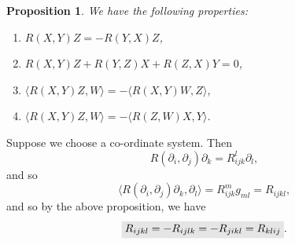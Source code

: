 \documentclass[letter-paper]{tufte-book}
\newtheorem{proposition}[theorem]{\color{pastel-blue}Proposition}
\newcommand{\highlight}[1]{\mathchoice%
  {\colorbox{black!10}{$\displaystyle#1$}}%
  {\colorbox{black!10}{$\textstyle#1$}}%
  {\colorbox{black!10}{$\scriptstyle#1$}}%
  {\colorbox{black!10}{$\scriptscriptstyle#1$}}}%
\begin{document}
\begin{proposition}
  We have the following properties:
  \begin{enumerate}
    \item $R(X,Y) Z = -R(Y,X) Z$,
    \item $R(X,Y) Z + R(Y,Z) X + R(Z,X) Y = 0$,
    \item $\langle R(X,Y)Z, W\rangle = -\langle R(X,Y)W, Z\rangle$,
    \item $\langle R(X,Y)Z, W\rangle = -\langle R(Z,W)X, Y\rangle$.
  \end{enumerate}
\end{proposition}

Suppose we choose a co-ordinate system. Then
\begin{equation*}
  R(\partial_i, \partial_j)\partial_k = R_{ijk}^l \partial_l,
\end{equation*}
and so
\begin{equation*}
  \langle R(\partial_i, \partial_j)\partial_k, \partial_l \rangle = R_{ijk}^m g_{ml} = R_{ijkl},
\end{equation*}
and so by the above proposition, we have
\begin{equation}
  \highlight{R_{ijkl} = -R_{ijlk} = -R_{jikl} = R_{klij}}.
\end{equation}
\end{document}
